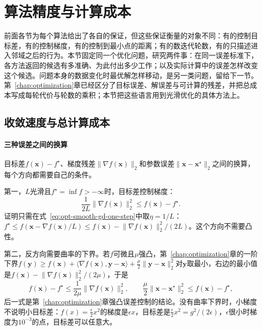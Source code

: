 \section{算法精度与计算成本}
\label{sec:opt-smooth-accuracy-cost}

前面各节为每个算法给出了各自的保证，但这些保证衡量的对象不同：有的控制目标差，有的控制梯度，有的控制到最小点的距离；有的数迭代轮数，有的只描述进入邻域之后的行为。本节固定同一个优化问题，研究两件事：在同一误差标准下，各方法返回的候选有多准确、为此付出多少工作；以及实际计算中的误差怎样改变这个候选。问题本身的数据变化时最优解怎样移动，是另一类问题，留给下一节。第~\ref{chap:optimization}章已经区分了目标误差、解误差与可计算的残差，并把总成本写成每轮代价与轮数的乘积；本节把这些语言用到光滑优化的具体方法上。

\subsection{收敛速度与总计算成本}
\label{sec:opt-smooth-rates-cost}

\paragraph{三种误差之间的换算}
目标差$f(\bm x)-f^\star$、梯度残差$\lVert\nabla f(\bm x)\rVert_2$和参数误差$\lVert\bm x-\bm x^\star\rVert_2$之间的换算，每个方向都需要自己的条件。

第一，$L$光滑且$f^\star=\inf f>-\infty$时，目标差控制梯度：
\begin{equation}
\label{eq:opt-smooth-gap-controls-gradient}
  \frac1{2L}\lVert\nabla f(\bm x)\rVert_2^2\leq f(\bm x)-f^\star .
\end{equation}
证明只需在式~\eqref{eq:opt-smooth-gd-one-step}中取$\eta=1/L$：$f^\star\leq f(\bm x-\nabla f(\bm x)/L)\leq f(\bm x)-\lVert\nabla f(\bm x)\rVert_2^2/(2L)$。这个方向不需要凸性。

第二，反方向需要曲率的下界。若$f$可微且$\mu$强凸，第~\ref{chap:optimization}章的一阶下界$f(\bm y)\geq f(\bm x)+\langle\nabla f(\bm x),\bm y-\bm x\rangle+\tfrac\mu2\lVert\bm y-\bm x\rVert_2^2$对$\bm y$取最小，右边的最小值是$f(\bm x)-\lVert\nabla f(\bm x)\rVert_2^2/(2\mu)$，于是
\[
  f(\bm x)-f^\star\leq\frac1{2\mu}\lVert\nabla f(\bm x)\rVert_2^2,\qquad\frac\mu2\lVert\bm x-\bm x^\star\rVert_2^2\leq f(\bm x)-f^\star,
\]
后一式是第~\ref{chap:optimization}章强凸误差控制的结论。没有曲率下界时，小梯度不说明小目标差：$f(x)=\tfrac\epsilon2x^2$的梯度是$\epsilon x$，目标差是$\tfrac\epsilon2x^2=g^2/(2\epsilon)$，$\epsilon$很小时梯度为$10^{-3}$的点，目标差可以任意大。

